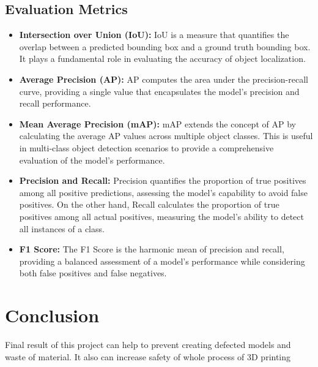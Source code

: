\documentclass[12pt,a4paper]{article}
\begin{document}
\subsection{Evaluation Metrics}
\begin{itemize}
    \item \textbf{Intersection over Union (IoU):}  IoU is a measure that quantifies the overlap between a predicted bounding box and a ground truth bounding box. It plays a fundamental role in evaluating the accuracy of object localization.
    \item \textbf{Average Precision (AP):} AP computes the area under the precision-recall curve, providing a single value that encapsulates the model's precision and recall performance.
    \item \textbf{Mean Average Precision (mAP):} mAP extends the concept of AP by calculating the average AP values across multiple object classes. This is useful in multi-class object detection scenarios to provide a comprehensive evaluation of the model's performance.
    \item \textbf{Precision and Recall:} Precision quantifies the proportion of true positives among all positive predictions, assessing the model's capability to avoid false positives. On the other hand, Recall calculates the proportion of true positives among all actual positives, measuring the model's ability to detect all instances of a class.
    \item \textbf{F1 Score:} The F1 Score is the harmonic mean of precision and recall, providing a balanced assessment of a model's performance while considering both false positives and false negatives.
\end{itemize}

\section{Conclusion}

Final result of this project can help to prevent creating defected models and waste of material. It also can increase safety of whole process of 3D printing 
\end{document}
